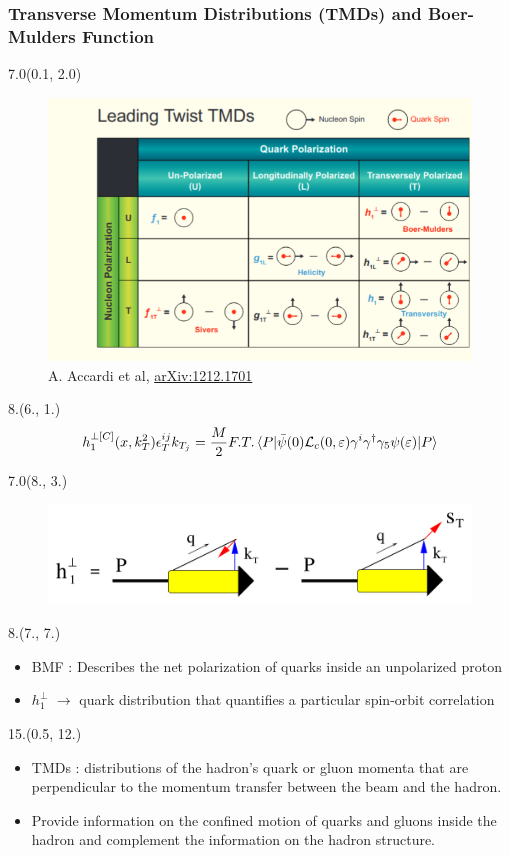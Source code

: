 \documentclass[12pt, xcolor={dvipsnames}, aspectratio = 169, sans, mathserif]{beamer}
\newenvironment{List}[2]
{\begin{textblock}{#1}#2
\begin{itemize}}
{\end{itemize}
\end{textblock}}
\newenvironment{Pic}[2]
{\begin{textblock}{#1}#2
\begin{figure}}
{\end{figure}
\end{textblock}}
\newcommand{\NewCaption}[3]{\caption{{#1}, \textcolor{blue}{\href{#2}{#3}}}}
\begin{document}
\begin{frame}
\frametitle{Transverse Momentum Distributions (TMDs) and Boer-Mulders Function}

\begin{Pic}{7.0}{(0.1, 2.0)}
  \NewCaption{A. Accardi et al}{https://arxiv.org/abs/1212.1701}{arXiv:1212.1701}
  \includegraphics[width=7.cm]{imgs/TMD.png}
\end{Pic}

\begin{textblock}{8.}(6., 1.)
\begin{equation*}
h_{1}^{\perp [C]} (x, k_{T}^{2})\epsilon_{T}^{ij}k_{T_{j}} = \frac{M}{2} F.T. \braket{P|\bar{\psi}(0)\mathcal{L}_{c}(0, \varepsilon)\gamma^{i}\gamma^{\dagger}\gamma_{5}\psi(\varepsilon)|P}
\end{equation*}
\end{textblock}

\begin{Pic}{7.0}{(8., 3.)}
  \includegraphics[width=7.cm]{imgs/BMF.png}
\end{Pic}

\begin{List}{8.}{(7., 7.)}

  \item BMF : Describes the net polarization of quarks inside an unpolarized proton

  \item $h_{1}^{\perp}$ $\rightarrow$ quark distribution that quantifies a particular spin-orbit correlation

\end{List}

\begin{List}{15.}{(0.5, 12.)}

  \item  TMDs : distributions of the hadron's quark or gluon momenta that are perpendicular to the momentum transfer between the beam and the hadron.

  \item Provide information on the confined motion of quarks and gluons inside the hadron and complement the information on the hadron structure.

\end{List}
\end{frame}
\end{document}
